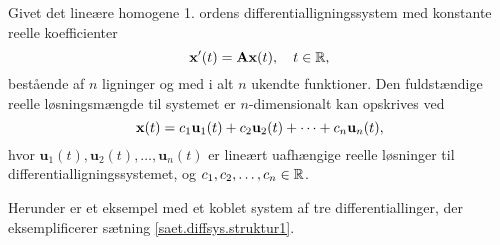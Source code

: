 \begin{theorem} \label{saet.diffsys.struktur1}
Givet det lineære homogene 1. ordens differentialligningssystem med konstante reelle koefficienter
\begin{equation}
\mathbf{x}'(t) = \mathbf{A} \mathbf{x}(t), \quad t \in \mathbb{R},
\end{equation}
bestående af $ n $ ligninger og med i alt $ n $ ukendte funktioner. Den fuldstændige reelle løsningsmængde til systemet er $n$-dimensionalt kan opskrives ved
\begin{equation}
\mathbf{x}(t) = c_1 \mathbf u_1(t) + c_2 \mathbf u_2(t) + \cdots + c_n \mathbf u_n(t),
\end{equation}
hvor $ \mathbf u_1(t),\mathbf u_2(t),\ldots,\mathbf u_n(t) $ er lineært uafhængige reelle løsninger til differentialligningssystemet, og $ c_1,c_2,\ldots,c_n \in \mathbb{R} $.
\end{theorem}

Herunder er et eksempel med et koblet system af tre differentiallinger, der eksemplificerer sætning \ref{saet.diffsys.struktur1}.

